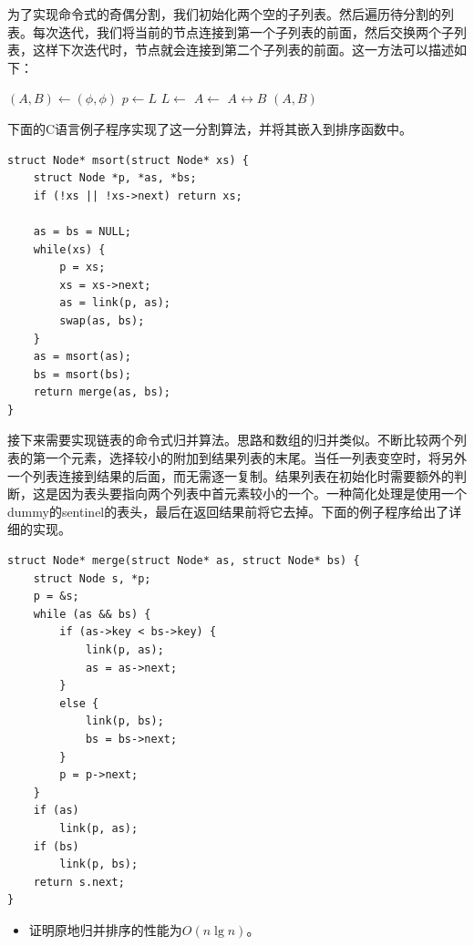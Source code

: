 \documentclass[b5paper]{ctexart}
\begin{document}
为了实现命令式的奇偶分割，我们初始化两个空的子列表。然后遍历待分割的列表。每次迭代，我们将当前的节点连接到第一个子列表的前面，然后交换两个子列表，这样下次迭代时，节点就会连接到第二个子列表的前面。这一方法可以描述如下：

\begin{algorithmic}[1]
  \State $(A, B) \gets (\phi, \phi)$
    \State $p \gets L$
    \State $L \gets $ 
    \State $A \gets $ 
    \State {} $A \leftrightarrow B$
  \EndWhile
  \State \Return $(A, B)$
\EndFunction
\end{algorithmic}

下面的C语言例子程序实现了这一分割算法，并将其嵌入到排序函数中。

\lstset{language=C}
\begin{lstlisting}
struct Node* msort(struct Node* xs) {
    struct Node *p, *as, *bs;
    if (!xs || !xs->next) return xs;

    as = bs = NULL;
    while(xs) {
        p = xs;
        xs = xs->next;
        as = link(p, as);
        swap(as, bs);
    }
    as = msort(as);
    bs = msort(bs);
    return merge(as, bs);
}
\end{lstlisting}

接下来需要实现链表的命令式归并算法。思路和数组的归并类似。不断比较两个列表的第一个元素，选择较小的附加到结果列表的末尾。当任一列表变空时，将另外一个列表连接到结果的后面，而无需逐一复制。结果列表在初始化时需要额外的判断，这是因为表头要指向两个列表中首元素较小的一个。一种简化处理是使用一个dummy的sentinel的表头，最后在返回结果前将它去掉。下面的例子程序给出了详细的实现。

\lstset{language=C}
\begin{lstlisting}
struct Node* merge(struct Node* as, struct Node* bs) {
    struct Node s, *p;
    p = &s;
    while (as && bs) {
        if (as->key < bs->key) {
            link(p, as);
            as = as->next;
        }
        else {
            link(p, bs);
            bs = bs->next;
        }
        p = p->next;
    }
    if (as)
        link(p, as);
    if (bs)
        link(p, bs);
    return s.next;
}
\end{lstlisting}

\begin{Exercise}
\begin{itemize}
\item 证明原地归并排序的性能为$O(n \lg n)$。
\end{itemize}
\end{Exercise}
\end{document}
